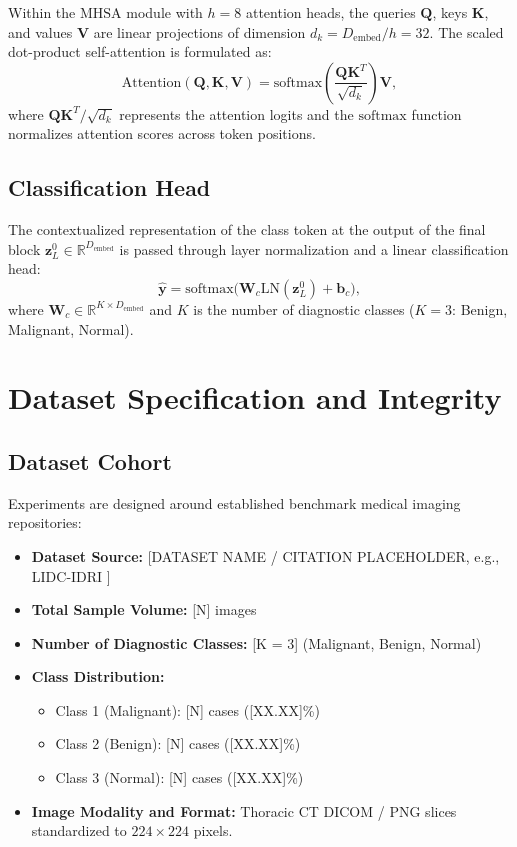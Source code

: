 \documentclass[conference]{IEEEtran}
\begin{document}
Within the $\text{MHSA}$ module with $h = 8$ attention heads, the queries $\mathbf{Q}$, keys $\mathbf{K}$, and values $\mathbf{V}$ are linear projections of dimension $d_k = D_{\text{embed}} / h = 32$. The scaled dot-product self-attention is formulated as:
\begin{equation}
\text{Attention}(\mathbf{Q}, \mathbf{K}, \mathbf{V}) = \text{softmax}\left( \frac{\mathbf{Q}\mathbf{K}^T}{\sqrt{d_k}} \right) \mathbf{V},
\end{equation}
where $\mathbf{Q}\mathbf{K}^T / \sqrt{d_k}$ represents the attention logits and the $\text{softmax}$ function normalizes attention scores across token positions.

\subsection{Classification Head}
The contextualized representation of the class token at the output of the final block $\mathbf{z}_L^0 \in \mathbb{R}^{D_{\text{embed}}}$ is passed through layer normalization and a linear classification head:
\begin{equation}
\hat{\mathbf{y}} = \text{softmax}\big( \mathbf{W}_c \text{LN}(\mathbf{z}_L^0) + \mathbf{b}_c \big),
\end{equation}
where $\mathbf{W}_c \in \mathbb{R}^{K \times D_{\text{embed}}}$ and $K$ is the number of diagnostic classes ($K = 3$: Benign, Malignant, Normal).

\section{Dataset Specification and Integrity}
\label{sec:dataset}

\subsection{Dataset Cohort}
Experiments are designed around established benchmark medical imaging repositories:
\begin{itemize}
    \item \textbf{Dataset Source:} [DATASET NAME / CITATION PLACEHOLDER, e.g., LIDC-IDRI \cite{armato2011lung}]
    \item \textbf{Total Sample Volume:} [N] images
    \item \textbf{Number of Diagnostic Classes:} [K = 3] (Malignant, Benign, Normal)
    \item \textbf{Class Distribution:}
      \begin{itemize}
          \item Class 1 (Malignant): [N] cases ([XX.XX]\%)
          \item Class 2 (Benign): [N] cases ([XX.XX]\%)
          \item Class 3 (Normal): [N] cases ([XX.XX]\%)
      \end{itemize}
    \item \textbf{Image Modality and Format:} Thoracic CT DICOM / PNG slices standardized to $224 \times 224$ pixels.
\end{itemize}
\end{document}
